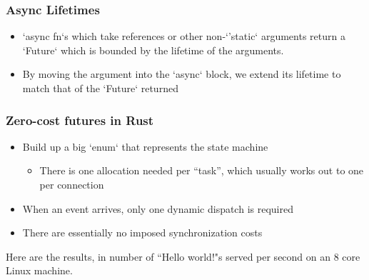 \begin{frame}[fragile]
    \frametitle{Async Lifetimes}
% 
% 
    \begin{itemize}
        \item `async fn`s which take references or other non-`'static` arguments return a `Future` which is bounded by the lifetime of the arguments.
    \end{itemize}
% 
% 
% 
    \begin{itemize}
        \item By moving the argument into the `async` block, we extend its lifetime to match that of the `Future` returned
    \end{itemize}
% 
% 
% 
\end{frame}
\begin{frame}[fragile]
    \frametitle{Zero-cost futures in Rust}
% 
% 
    \begin{itemize}
        \item Build up a big `enum` that represents the state machine
    	\begin{itemize}
    	    \item There is one allocation needed per “task”, which usually works out to one per connection
    	\end{itemize}
        \item When an event arrives, only one dynamic dispatch is required
        \item There are essentially no imposed synchronization costs
    \end{itemize}
% 
Here are the results, in number of “Hello world!"s served per second on an 8 core Linux machine.
% 
% 
\end{frame}

